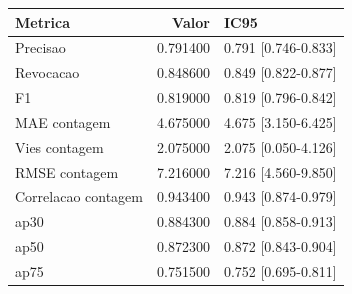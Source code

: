 \begin{tabular}{lrl}
\toprule
Metrica & Valor & IC95 \\
\midrule
Precisao & 0.791400 & 0.791 [0.746-0.833] \\
Revocacao & 0.848600 & 0.849 [0.822-0.877] \\
F1 & 0.819000 & 0.819 [0.796-0.842] \\
MAE contagem & 4.675000 & 4.675 [3.150-6.425] \\
Vies contagem & 2.075000 & 2.075 [0.050-4.126] \\
RMSE contagem & 7.216000 & 7.216 [4.560-9.850] \\
Correlacao contagem & 0.943400 & 0.943 [0.874-0.979] \\
ap30 & 0.884300 & 0.884 [0.858-0.913] \\
ap50 & 0.872300 & 0.872 [0.843-0.904] \\
ap75 & 0.751500 & 0.752 [0.695-0.811] \\
\bottomrule
\end{tabular}
